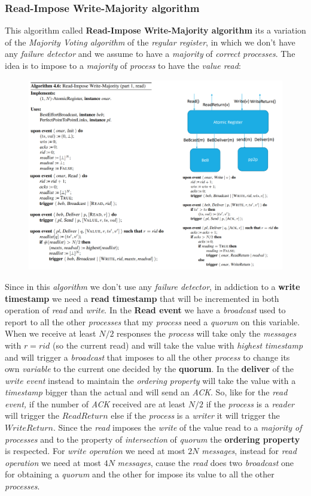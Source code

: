 \documentclass{article}
\begin{document}
\subsubsection{Read-Impose Write-Majority algorithm}
This algorithm called \textbf{Read-Impose Write-Majority algorithm} its a variation of the \emph{Majority Voting algorithm} of the \emph{regular register}, in which we don't have any \emph{failure detector} and we assume to have a \emph{majority} of \emph{correct processes}. The idea is to impose to a \emph{majority} of \emph{process} to have the \emph{value read}: 
\begin{figure}[H]
  \centering
  \includegraphics[scale=0.9,left]{cattura74.png}
\end{figure}
Since in this \emph{algorithm} we don't use any \emph{failure detector}, in addiction to a \textbf{write timestamp} we need a \textbf{read timestamp} that will be incremented in both operation of \emph{read} and \emph{write}. In the \textbf{Read event} we have a \emph{broadcast} used to report to all the other \emph{processes} that my \emph{process} need a \emph{quorum} on this variable. When we receive at least $N/2$ responses the \emph{process} will take only the \emph{messages} with $r=rid$ (so the current read) and will take the value with \emph{highest timestamp} and will trigger a \emph{broadcast} that imposes to all the other \emph{process} to change its own \emph{variable} to the current one decided by the \textbf{quorum}. In the \textbf{deliver} of the \emph{write event} instead to maintain the \emph{ordering property} will take the value with a \emph{timestamp} bigger than the actual and will send an \emph{ACK}. So, like for the \emph{read event,} if the number of \emph{ACK} received are at least $N/2$ if the \emph{process} is a \emph{reader} will trigger the $ReadReturn$ else if the \emph{process} is a \emph{writer} it will trigger the $WriteReturn$. Since the \emph{read} imposes the \emph{write} of the value read to a \emph{majority of processes} and to the property of \emph{intersection} of \emph{quorum} the \textbf{ordering property} is respected. For \emph{write operation} we need at most $2N$ \emph{messages}, instead for \emph{read operation} we need at most $4N$ \emph{messages}, cause the \emph{read} does two \emph{broadcast} one for obtaining a \emph{quorum} and the other for impose its value to all the other \emph{processes}.
\end{document}
